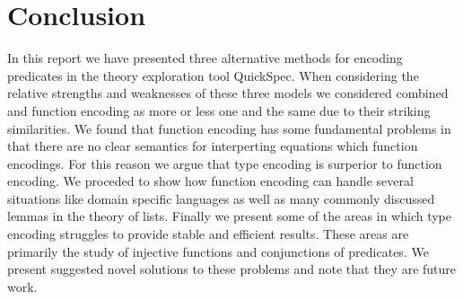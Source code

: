 \section{Conclusion}
In this report we have presented three
alternative methods for encoding predicates
in the theory exploration tool QuickSpec.
When considering the relative strengths and weaknesses
of these three models we considered combined and function
encoding as more or less one and the same due to their
striking similarities. We found that function encoding has
some fundamental problems in that there are no clear
semantics for interperting equations which function encodings.
For this reason we argue that type encoding is surperior
to function encoding. We proceded to show how function encoding
can handle several situations like domain specific languages
as well as many commonly discussed lemmas in the theory
of lists. Finally we present some of the areas in which
type encoding struggles to provide stable and efficient results.
These areas are primarily the study of injective functions
and conjunctions of predicates. We present suggested novel
solutions to these problems and note that they are future work.
